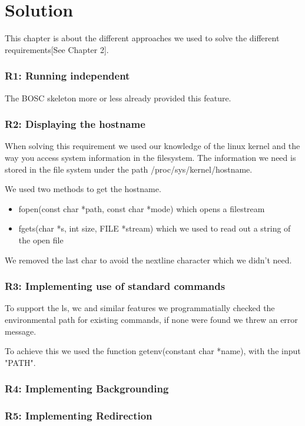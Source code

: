\chapter{Solution}
This chapter is about the different approaches we used to solve the different requirements[See Chapter 2].
\subsection{R1: Running independent}
The BOSC skeleton more or less already provided this feature.

\subsection{R2: Displaying the hostname}
When solving this requirement we used our knowledge of the linux kernel and the way you access system information in the filesystem. The information we need is stored in the file system under the path /proc/sys/kernel/hostname.

We used two methods to get the hostname.
\begin{itemize}
\item fopen(const char *path, const char *mode) which opens a filestream
\item fgets(char *s, int size, FILE *stream) which we used to read out a string of the open file
\end{itemize}
We removed the last char to avoid the nextline character which we didn't need.

\subsection{R3: Implementing use of standard commands}
To support the ls, wc and similar features we programmatially checked the environmental path for existing commands, if none were found we threw an error message.

To achieve this we used the function getenv(constant char *name), with the input "PATH".

\subsection{R4: Implementing Backgrounding}

\subsection{R5: Implementing Redirection}

